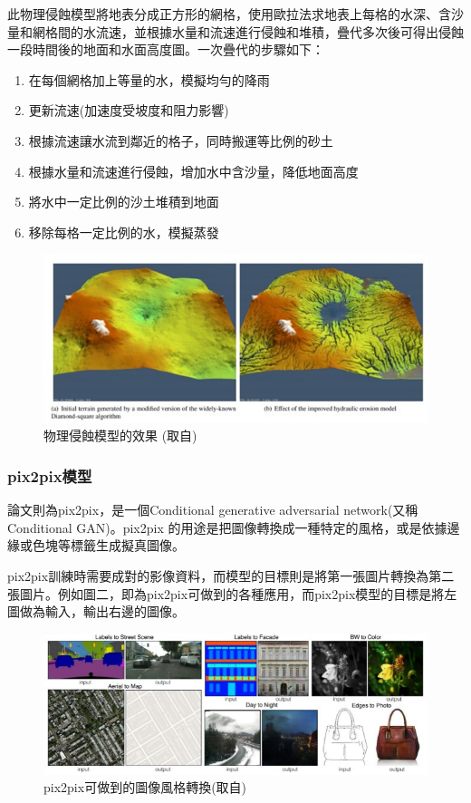 \documentclass[a4paper, 12pt]{article}
\begin{document}
此物理侵蝕模型將地表分成正方形的網格，使用歐拉法求地表上每格的水深、含沙量和網格間的水流速，並根據水量和流速進行侵蝕和堆積，疊代多次後可得出侵蝕一段時間後的地面和水面高度圖。一次疊代的步驟如下：

\begin{enumerate}
    \item 在每個網格加上等量的水，模擬均勻的降雨
    \item 更新流速(加速度受坡度和阻力影響)
    \item 根據流速讓水流到鄰近的格子，同時搬運等比例的砂土
    \item 根據水量和流速進行侵蝕，增加水中含沙量，降低地面高度
    \item 將水中一定比例的沙土堆積到地面
    \item 移除每格一定比例的水，模擬蒸發
\end{enumerate}


\begin{figure}[htbp]
    \centering
    \includegraphics[width=\linewidth]{fig/1.jpg}
    \caption{物理侵蝕模型的效果 (取自\cite{jako2011fast})}
    \label{fig:1}
\end{figure}


\subsubsection{pix2pix模型}
論文\cite{isola2017image}則為pix2pix，是一個Conditional generative adversarial network(又稱 Conditional GAN)。pix2pix 的用途是把圖像轉換成一種特定的風格，或是依據邊緣或色塊等標籤生成擬真圖像。

pix2pix訓練時需要成對的影像資料，而模型的目標則是將第一張圖片轉換為第二張圖片。例如圖二，即為pix2pix可做到的各種應用，而pix2pix模型的目標是將左圖做為輸入，輸出右邊的圖像。

\begin{figure}[htbp]
    \centering
    \includegraphics[width=\linewidth]{fig/2.jpg}
    \caption{pix2pix可做到的圖像風格轉換(取自\cite{isola2017image})}
    \label{fig:2}
\end{figure}
\end{document}
